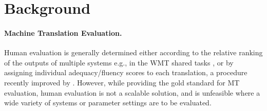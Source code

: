 \documentclass[11pt]{article}
\newcommand{\secref}[1]{Section~\ref{#1}}
\begin{document}
\section{Background}\label{sec:background}





\paragraph{Machine Translation Evaluation.}
Human evaluation is generally determined
either according to the relative ranking of the outputs of multiple systems
e.g., in the WMT shared tasks \cite{bojar2015findings}, or by assigning
individual adequacy/fluency scores to each translation, a procedure recently improved
by .
However, while providing the gold standard for MT evaluation, human evaluation is not a scalable solution,
and is unfeasible where a wide variety of systems or parameter settings are to be evaluated.
\end{document}
